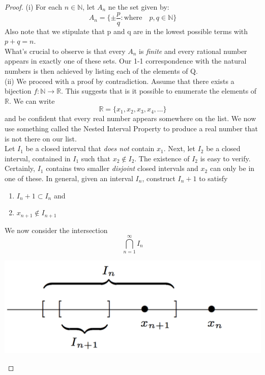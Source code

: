 \documentclass{tufte-book}
\theoremstyle{definition}
\numberwithin{section}{chapter}
\begin{document}
\begin{proof}
(i) For each $n \in \mathbb{N}$, let $A_n$ ne the set given by:
\[A_n = \{\pm \frac{p}{q}: \text{where} \quad p,q \in \mathbb{N} \}\]
Also note that we stipulate that p and q are in the lowest possible terms with $p+q=n$.  \\
What's crucial to observe is that every $A_n$ is \emph{finite} and every rational number appears in exactly one of these sets.  Our 1-1 correspondence with the natural numbers is then achieved by listing each of the elements of Q.  \\
(ii) We proceed with a proof by contradiction.  Assume that there exists a bijection $f: \mathbb{N} \to \mathbb{R}$. This suggests that is it possible to enumerate the elements of $\mathbb{R}$.  We can write
\begin{equation}\mathbb{R} = \{x_1, x_2, x_3, x_4, \ldots\}\end{equation}
and be confident that every real number appears somewhere on the list.  We now use something called the Nested Interval Property to produce a real number that is not there on our list.\\  Let $I_1$ be a closed interval that \emph{does not} contain $x_1$.  Next, let $I_2$ be a closed interval, contained in $I_1$ such that $x_2 \notin I_2$.  The existence of $I_2$ is easy to verify.  Certainly, $I_1$ contains two smaller \emph{disjoint} closed intervals and $x_2$ can only be in one of these.  In general, given an interval $I_n$, construct $I_n+1$ to satisfy \begin{enumerate}
	\item $I_n+1 \subset I_n$ and
	\item $x_{n+1} \notin I_{n+1}$
\end{enumerate}


We now consider the intersection \[ \bigcap_{n=1}^{\infty}I_n \]  

\begin{marginfigure}
  \includegraphics{NIP_RealsUncount.pdf}
\end{marginfigure}


\end{proof}
\end{document}

